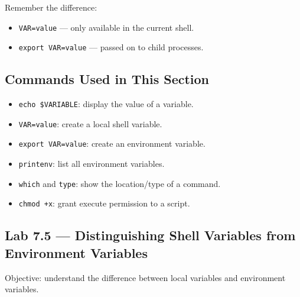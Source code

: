 \begin{tipbox}
Remember the difference:
\begin{itemize}
  \item \texttt{VAR=value} --- only available in the current shell.
  \item \texttt{export VAR=value} --- passed on to child processes.
\end{itemize}
\end{tipbox}

\subsection*{Commands Used in This Section}

\begin{itemize}
  \item \texttt{echo \$VARIABLE}: display the value of a variable.
  \item \texttt{VAR=value}: create a local shell variable.
  \item \texttt{export VAR=value}: create an environment variable.
  \item \texttt{printenv}: list all environment variables.
  \item \texttt{which} and \texttt{type}: show the location/type of a command.
  \item \texttt{chmod +x}: grant execute permission to a script.
\end{itemize}

\subsection*{Lab 7.5 --- Distinguishing Shell Variables from Environment Variables}

Objective: understand the difference between local variables and environment
variables.

